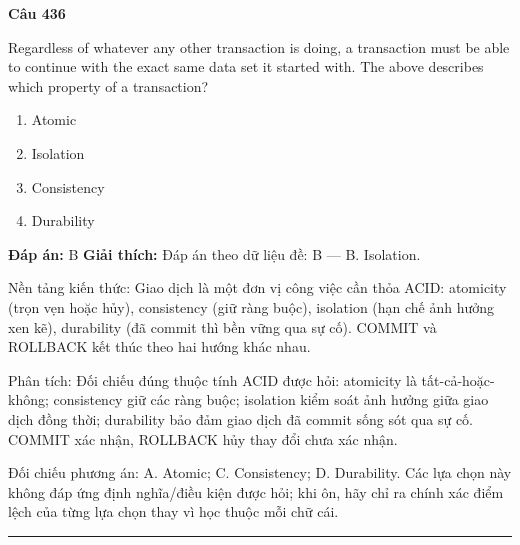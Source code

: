 \documentclass[11pt,a4paper]{article}
\newenvironment{question}[1]{%
  \par\vspace{1em}\noindent\textbf{\large Câu #1}\par\vspace{0.4em}
}{%
  \par\vspace{1em}\hrule\vspace{0.6em}
}
\newenvironment{choices}{%
  \begin{enumerate}[label=\textbf{\Alph*.},leftmargin=2.2em,itemsep=2pt,topsep=3pt]
}{%
  \end{enumerate}
}
\newcommand{\choice}{\item}
\begin{document}
\begin{question}{436}
Regardless of whatever any other transaction is doing, a transaction must be able to continue with the exact same data set it started with.
The above describes which property of a transaction?
\begin{choices}
\choice Atomic
\choice Isolation
\choice Consistency
\choice Durability
\end{choices}
\textbf{Đáp án:} B
\textbf{Giải thích:} Đáp án theo dữ liệu đề: B — B. Isolation.

Nền tảng kiến thức: Giao dịch là một đơn vị công việc cần thỏa ACID: atomicity (trọn vẹn hoặc hủy), consistency (giữ ràng buộc), isolation (hạn chế ảnh hưởng xen kẽ), durability (đã commit thì bền vững qua sự cố). COMMIT và ROLLBACK kết thúc theo hai hướng khác nhau.

Phân tích: Đối chiếu đúng thuộc tính ACID được hỏi: atomicity là tất-cả-hoặc-không; consistency giữ các ràng buộc; isolation kiểm soát ảnh hưởng giữa giao dịch đồng thời; durability bảo đảm giao dịch đã commit sống sót qua sự cố. COMMIT xác nhận, ROLLBACK hủy thay đổi chưa xác nhận.

Đối chiếu phương án: A. Atomic; C. Consistency; D. Durability. Các lựa chọn này không đáp ứng định nghĩa/điều kiện được hỏi; khi ôn, hãy chỉ ra chính xác điểm lệch của từng lựa chọn thay vì học thuộc mỗi chữ cái.
\end{question}
\end{document}
